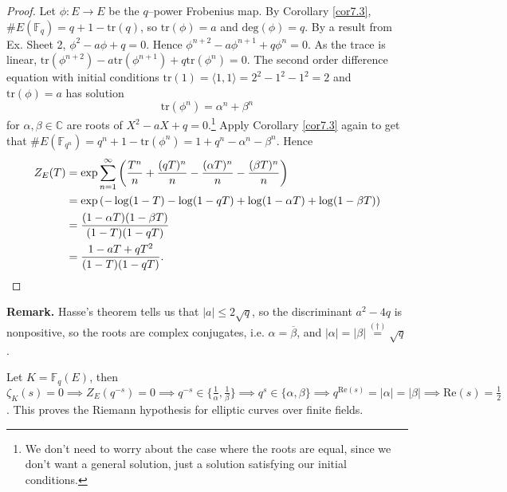 \documentclass{article}
\theoremstyle{definition}
\begin{document}
\begin{proof}
    Let $\phi : E \to E$ be the $q$--power Frobenius map. By Corollary \ref{cor7.3}, $\# E(\mathbb{F}_q) = q+1 - \text{tr}(q)$, so $\text{tr}(\phi) = a$ and $\text{deg}(\phi) = q$. By a result from Ex. Sheet 2, $\phi^2 - a \phi + q = 0$. Hence $\phi^{n+2} - a \phi^{n+1}  + q \phi^n = 0$. As the trace is linear, $\text{tr}(\phi^{n+2})-a \text{tr}(\phi^{n+1}) + q \text{tr}(\phi^n) = 0$. The second order difference equation with initial conditions $\text{tr}(1)=\langle 1,1 \rangle = 2^2-1^2-1^2 = 2$ and $\text{tr}(\phi) = a$ has solution \[
    \text{tr}(\phi^n) = \alpha^n + \beta^n
    \]
    for $\alpha, \beta \in \mathbb{C}$ are roots of $X^2 - aX + q = 0$.\footnote{We don't need to worry about the case where the roots are equal, since we don't want a general solution, just a solution satisfying our initial conditions.} Apply Corollary \ref{cor7.3} again to get that $\#E(\mathbb{F}_{q^n}) = q^n +1 - \text{tr}(\phi^n) = 1 + q^n - \alpha^n - \beta^n$. Hence
    \begin{align*}
        Z_E(T) &= \exp \sum_{n=1}^{\infty} \left(\frac{T^n}{n}+\frac{(qT)^n}{n}-\frac{(\alpha T)^n}{n} - \frac{(\beta T)^n}{n} \right) \\
        &= \exp \left( -\log(1-T) - \log(1-qT) + \log(1-\alpha T)+ \log(1 - \beta T) \right) \\
        &= \frac{(1-\alpha T)(1 - \beta T)}{(1-T)(1-qT)} \\
        &= \frac{1-a T +qT^2}{(1-T)(1-qT)}.
        \qedhere
    \end{align*}
\end{proof}
\textbf{Remark.} Hasse's theorem tells us that $\left|a\right|\le 2\sqrt{q}$, so the discriminant $a^2-4q$ is nonpositive, so the roots are complex conjugates, i.e. $\alpha = \overline{\beta}$, and $\left|\alpha\right|=\left|\beta\right|\stackrel{(\dagger)}{=} \sqrt{q}$.
\vspace{1mm}
 
Let $K = \mathbb{F}_q(E)$, then $\zeta_K(s) = 0 \implies  Z_E(q^{-s}) = 0 \implies q^{-s} \in \{\frac{1}{\alpha},\frac{1}{\beta}\} \implies q^s \in \{\alpha,\beta\} \implies q^{\text{Re}(s)} = \left|\alpha\right| = \left|\beta\right| \implies \text{Re}(s) = \frac{1}{2}$. This proves the Riemann hypothesis for elliptic curves over finite fields.
\end{document}
